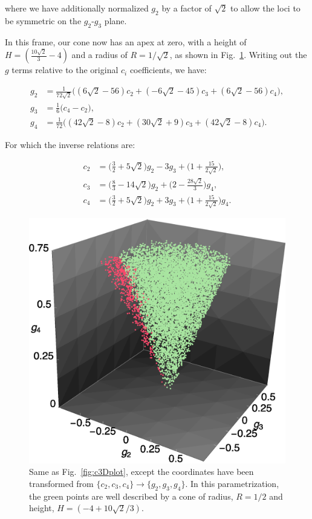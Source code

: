 where we have additionally normalized $g_2$ by a factor of $\sqrt{2}$ to allow
the loci to be symmetric on the $g_2$-$g_3$ plane.

In this frame, our cone now has an apex at zero, with a height of
$H = (\frac{10\sqrt{2}}{3} - 4)$ and a radius of $R = 1/\sqrt{2}$, as shown in
Fig.~\ref{fig:g3Dplot}. Writing out the $g$ terms relative to the original 
$c_i$ coefficients, we have:

\begin{align}
g_2 &= \frac{1}{72\sqrt{2}} \Big( (6\sqrt{2}-56)c_2 + (-6\sqrt{2}-45)c_3 + (6\sqrt{2}-56)c_4 \Big),\\
g_3 &= \frac{1}{6} \Big( c_4 - c_2 \Big),\\
g_4 &= \frac{1}{72} \Big( (42\sqrt{2}-8)c_2 + (30\sqrt{2}+9)c_3 + (42\sqrt{2}-8)c_4 \Big).
\end{align}

For which the inverse relations are:

\begin{align}
c_2 &= \Big( \frac{3}{2} + 5\sqrt{2} \Big) g_2 - 3 g_3 + \Big( 1 + \frac{ 15 }{ 2\sqrt{2} } \Big),\\
c_3 &= \Big( \frac{8}{3} - 14\sqrt{2} \Big) g_2 + \Big( 2 - \frac{28\sqrt{2}}{3} \Big) g_4,\\
c_4 &= \Big( \frac{3}{2} + 5\sqrt{2} \Big) g_2 + 3 g_3 + \Big( 1 + \frac{15}{2\sqrt{2}} \Big) g_4.
\end{align}

\begin{figure}
\includegraphics[width=\columnwidth]{g3Dplot.eps}
\caption{
Same as Fig.~\ref{fig:c3Dplot}, except the coordinates have been transformed
from $\{c_2,c_3,c_4\}\to\{g_2,g_3,g_4\}$. In this parametrization, the green 
points are well described by a cone of radius, $R=1/2$ and height, 
$H=(-4 + 10\sqrt{2}/3)$.
}
\label{fig:g3Dplot}
\end{figure}

